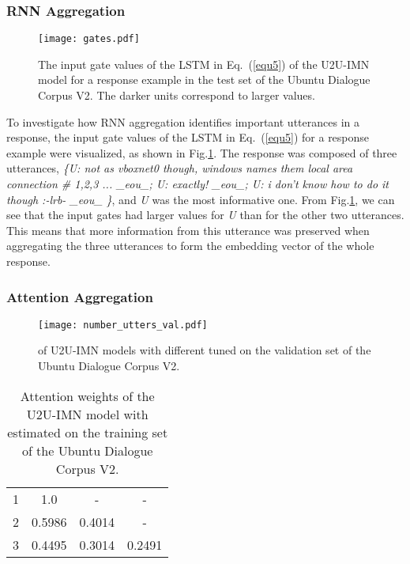 \documentclass[journal]{IEEEtran}
\begin{document}
    \subsubsection{RNN Aggregation}

      \begin{figure}
      \centering
      \texttt{[image: gates.pdf]}
      \caption{The input gate values of the LSTM in Eq.~(\ref{equ5}) of the U2U-IMN model for a response example in the test set of the Ubuntu Dialogue Corpus V2. The darker units correspond to larger values.}
      \label{fig7}
      \end{figure}

      To investigate how RNN aggregation identifies important utterances in a response, the input gate values of the LSTM in Eq.~(\ref{equ5}) for a response example were visualized, as shown in Fig.\ref{fig7}.
      The response was composed of three utterances,
      \emph{\{U: not as vboxnet0 though, windows names them local area connection \# 1,2,3 ... \_eou\_;
              U: exactly! \_eou\_;
              U: i don't know how to do it though :-lrb- \_eou\_ \}}, and
      \emph{U} was the most informative one. From Fig.\ref{fig7}, we can see that the input gates had larger values for \emph{U} than for the other two utterances. This means that more information from this utterance was preserved when aggregating the three utterances to form the embedding vector of the whole response.

    \subsubsection{Attention Aggregation}

      \begin{figure}\centering
      \texttt{[image: number\_utters\_val.pdf]}
      \caption{ of U2U-IMN models with different  tuned on the validation set of the Ubuntu Dialogue Corpus V2.}
      \label{fig8}
      \end{figure}

      \begin{table}[t]
      \small
      \caption{Attention weights  of the U2U-IMN model with  estimated on the training set of the Ubuntu Dialogue Corpus V2. }
      \label{tab8}
      \centering
      \begin{tabular}{cccc}
      \toprule
         &  &  &   \\
      \midrule
      1   & 1.0     & -       & -      \\
      2   & 0.5986  & 0.4014  & -      \\
      3   & 0.4495  & 0.3014  & 0.2491 \\
      \bottomrule
      \end{tabular}
      \end{table}
\end{document}
